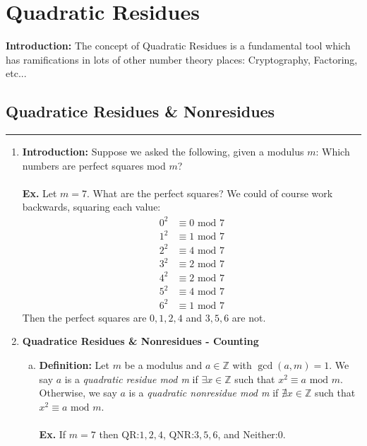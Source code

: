 \documentclass[class=article, crop=false]{standalone}
\def\integers{{\mathbb Z}}
\begin{document}
    
\section{Quadratic Residues}
\textbf{Introduction:} The concept of Quadratic Residues is a fundamental tool
which has ramifications in lots of other number theory places: Cryptography, Factoring,
etc...
\subsection{Quadratice Residues \& Nonresidues}
\rule{\textwidth}{1pt}
\begin{enumerate}[1.]
\item \textbf{Introduction:} Suppose we asked the following, given a modulus $m$:
Which numbers are perfect squares mod $m$? \\\\
\textbf{Ex.} Let $m=7$. What are the perfect squares? We could of course work backwards,
squaring each value:
\begin{align*}
	0^2 &\equiv 0\mbox{ mod } 7 \\
	1^2 &\equiv 1\mbox{ mod } 7 \\
	2^2 &\equiv 4\mbox{ mod } 7 \\
	3^2 &\equiv 2\mbox{ mod } 7 \\
	4^2 &\equiv 2\mbox{ mod } 7 \\
	5^2 &\equiv 4\mbox{ mod } 7 \\
	6^2 &\equiv 1\mbox{ mod } 7
\end{align*}
Then the perfect squares are $0,1,2,4$ and $3,5,6$ are not.

\item \textbf{Quadratice Residues \& Nonresidues - Counting}
\begin{enumerate}[(a)]
	\item \textbf{Definition:} Let $m$ be a modulus and $a\in\integers$ with $\gcd(a,m)=1$.
	We say $a$ is a \textit{quadratic residue mod m} if $\exists x\in\integers$ such that 
	$x^2 \equiv a\mbox{ mod } m$. Otherwise, we say $a$ is a \textit{quadratic nonresidue mod m}
	if $\nexists x\in\integers$ such that $x^2 \equiv a\mbox{ mod } m$. \\\\
	\textbf{Ex.} If $m=7$ then QR:$1,2,4$, QNR:$3,5,6$, and Neither:$0$.
	

\end{enumerate}
\end{enumerate}
\end{document}
